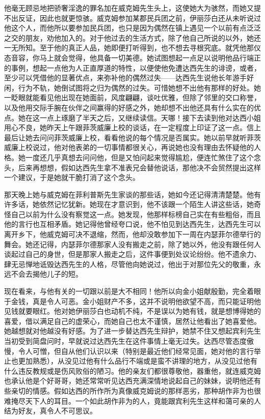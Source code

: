 \par 他毫无顾忌地把骄奢淫逸的罪名加在威克姆先生头上，这使她大为骇然，而她又提不出反证，因此也就更惊骇。威克姆参加某郡民兵团之前，伊丽莎白还从未听说过他这个人，而他所以要参加民兵团，也只是因为偶然在镇上遇见一个以前有点泛泛之交的朋友，劝他加入的。对于他过去的生活方式，除了他自己所说的以外，她还一无所知。至于他的真正人品，她即便打听得到，也不想去寻根究底。就凭他那仪态音容，你马上就会觉得，他具备一切美德。她试图想起一点足以说明他品行端正的事例，想起一点他为人正直厚道的特性，以便使他免遭达西先生的诽谤，或者，至少可以凭借他的显著优点，来弥补他的偶然过失——达西先生说他长年游手好闲，行为不轨，她倒试图将之归为偶然的过失。可惜她想不出他有那样的好处。她一眨眼就能看见他出现在她面前，风度翩翩，谈吐优雅，但除了邻里的交口称誉，以及他用交际手腕在伙伴之间赢得的好感之外，她却想不出他还具有什么实在的优点。她在这一点上琢磨了半天之后，又继续读信。天哪！接下去读到他对达西小姐用心不良，她昨天上午跟菲茨威廉上校的谈话，在一定程度上印证了这一点。信上最后让她去问问菲茨威廉上校，看看他说的每个情况是否属实。她以前早就听菲茨威廉上校说过，他对他表弟的一切事情都很关心，再说她也没有理由去怀疑他的人格。她一度还几乎真想去问问他，但是又怕问起来觉得尴尬，便连忙煞住了这个念头，后来再想想，假如达西先生拿不准表兄会替他说话，那他决不会贸然提出这样一个建议，于是她就干脆打消了这个念头。
\par 那天晚上她与威克姆在菲利普斯先生家谈的那些话，她如今还记得清清楚楚。他有许多话，她依然记忆犹新。她现在才意识到，他不该跟一个陌生人讲这些话，她奇怪自己以前为什么没有察觉这一点。她发现，他那样标榜自己实在有些粗俗，而且他的言行也互相矛盾。她记得他曾经夸口说，他不怕见到达西先生，达西先生可以离开乡下，他威克姆可决不退缩，然而，他却没敢参加下一周在内瑟菲尔德举行的舞会。她还记得，内瑟菲尔德那家人没有搬走之前，除了她以外，他没有跟任何人谈起过自己的身世，但是那家人搬走之后，这件事便到处议论纷纷。他不遗余力、肆无忌惮地诋毁达西先生的人格，尽管他向她说过，他出于对那位先父的敬重，永远不会去揭他儿子的短。
\par 现在看来，与他有关的一切跟以前是大不相同！他所以向金小姐献殷勤，完全着眼于金钱，真是令人可恶。金小姐财产不多，这并不说明他欲望不高，而只能证明他见钱就要眼红。他对她伊丽莎白也动机不纯，不是误以为她有钱，就是想博得她的喜爱，借以满足自己的虚荣心，而她自己也太不谨慎，居然让他看出了她喜爱他。她越想就对他越没有好感。为了进一步替达西先生辩护，她禁不住又想起宾利先生当初受到简盘问时，早就说过达西先生在这件事情上毫无过失。达西尽管态度傲慢，令人可憎，但自从他们认识以来（特别是最近他们经常见面，她对他的言行举止也更加熟悉），从没见过他有什么品行不端或是蛮不讲理的地方，从没见过他有什么违反教规或是伤风败俗的陋习。他的亲友们都很尊敬他，器重他，就连威克姆也承认他是个好哥哥，她还常常听见达西充满深情地说起自己的妹妹，说明他还有些亲切的情感。假如达西的所作所为真像威克姆说的那样恶劣，那种胡作非为也很难掩尽天下人的耳目。一个如此胡作非为的人，竟能跟宾利先生这样和蔼可亲的人结为好友，真令人不可思议。
